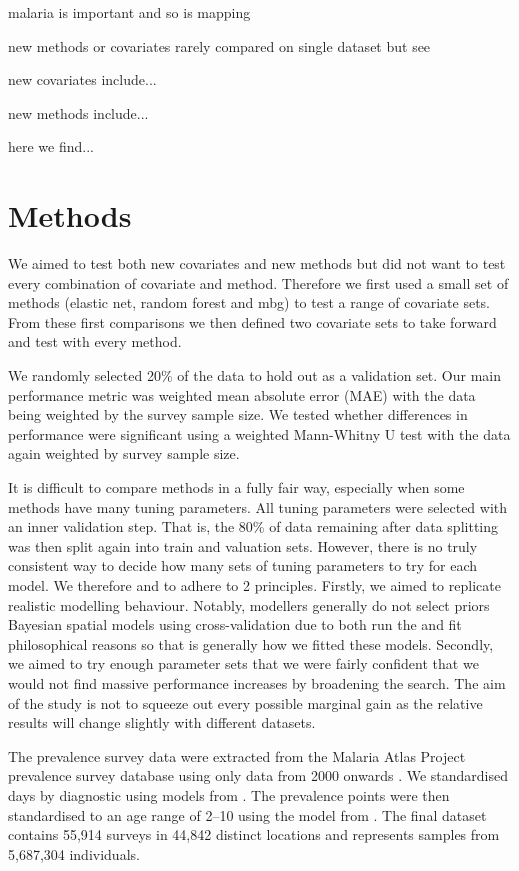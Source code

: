 \documentclass{bmcart}
\begin{document}
malaria is important and so is mapping

new methods or covariates rarely compared on single dataset
but see

new covariates include...

new methods include...

here we find...


\section*{Methods}


We aimed to test both new covariates and new methods but did not want to test every combination of covariate and method.
Therefore we first used a small set of methods (elastic net, random forest and mbg) to test a range of covariate sets.
From these first comparisons we then defined two covariate sets to take forward and test with every method.



We randomly selected 20\% of the data to hold out as a validation set.
Our main performance metric was weighted mean absolute error (MAE) with the data being weighted by the survey sample size.
We tested whether differences in performance were significant using a weighted Mann-Whitny U test with the data again weighted by survey sample size.

It is difficult to compare methods in a fully fair way, especially when some methods have many tuning parameters.
All tuning parameters were selected with an inner validation step.
That is, the 80\% of data remaining after data splitting was then split again into train and valuation sets.
However, there is no truly consistent way to decide how many sets of tuning parameters to try for each model.
We therefore and to adhere to 2 principles.
Firstly, we aimed to replicate realistic modelling behaviour.
Notably, modellers generally do not select priors Bayesian spatial models using cross-validation due to both run the and fit philosophical reasons so that is generally how we fitted these models.
Secondly, we aimed to try enough parameter sets that we were fairly confident that we would not find massive performance increases by broadening the search.
The aim of the study is not to squeeze out every possible marginal gain as the relative results will change slightly with different datasets.


The prevalence survey data were extracted from the Malaria Atlas Project prevalence survey database using only data from 2000 onwards \cite{bhatt2015effect, guerra2007assembling, pfeffer2018ma}.
We standardised days by diagnostic using models from \cite{}.
The prevalence points were then standardised to an age range of 2--10 using the model from \cite{smith2007standardizing}.
The final dataset contains 55,914 surveys in 44,842 distinct locations and represents samples from 5,687,304 individuals.
\end{document}
